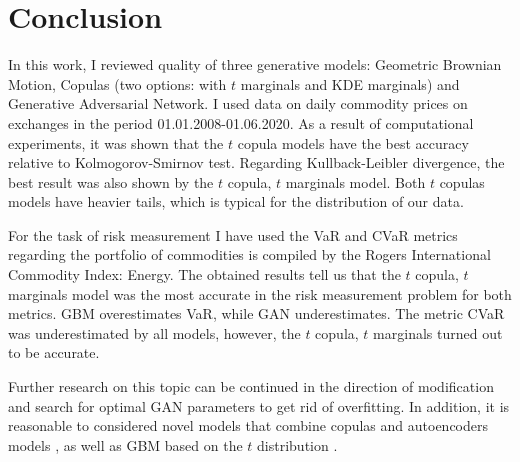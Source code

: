 \documentclass{article}
\begin{document}
\section{Conclusion}
\label{section:conclustion}
In this work, I reviewed quality of three generative models: Geometric Brownian Motion, Copulas (two options: with $t$ marginals and KDE marginals) and Generative Adversarial Network. I used data on daily commodity prices on exchanges in the period 01.01.2008-01.06.2020. As a result of computational experiments, it was shown that the $t$ copula models have the best accuracy relative to Kolmogorov-Smirnov test. Regarding Kullback-Leibler divergence, the best result was also shown by the $t$ copula, $t$ marginals model. Both $t$ copulas models have heavier tails, which is typical for the  distribution of our data.

For the task of risk measurement I have used the VaR and CVaR metrics regarding the portfolio of commodities is compiled by the Rogers International Commodity Index: Energy. The obtained results tell us that the $t$ copula, $t$ marginals model was the most accurate in the risk measurement problem for both metrics. GBM overestimates VaR, while GAN underestimates. The metric CVaR was underestimated by all models, however, the $t$ copula, $t$ marginals turned out to be accurate.

Further research on this topic can be continued in the direction of modification and search for optimal GAN parameters to get rid of overfitting. In addition, it is reasonable to considered novel models that combine copulas and autoencoders models \cite{tagasovska2019copulas}, as well as GBM based on the $t$ distribution \cite{Nkemnole}.


\end{document}
